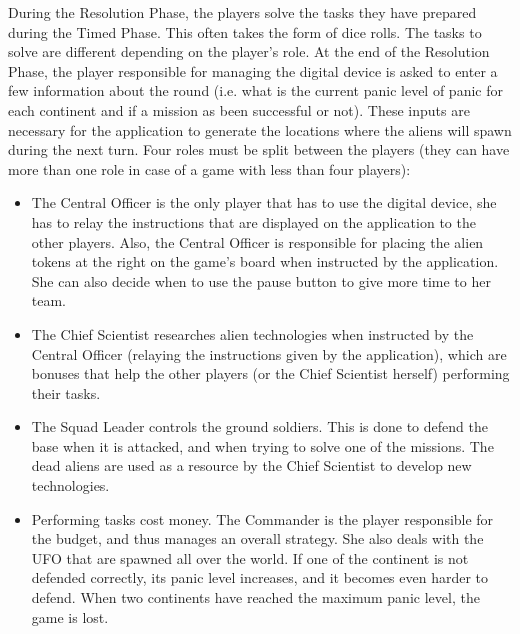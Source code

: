 During the Resolution Phase, the players solve the tasks they have prepared during the Timed Phase. This often takes the form of dice rolls. The tasks to solve are different depending on the player's role. At the end of the Resolution Phase, the player responsible for managing the digital device is asked to enter a few information about the round (i.e. what is the current panic level of panic for each continent and if a mission as been successful or not). These inputs are necessary for the application to generate the locations where the aliens will spawn during the next turn. Four roles must be split between the players (they can have more than one role in case of a game with less than four players):
\begin{itemize}
\item The Central Officer is the only player that has to use the digital device, she has to relay the instructions that are displayed on the application to the other players. Also, the Central Officer is responsible for placing the alien tokens at the right on the game's board when instructed by the application. She can also decide when to use the pause button to give more time to her team.
\item The Chief Scientist researches alien technologies when instructed by the Central Officer (relaying the instructions given by the application), which are bonuses that help the other players (or the Chief Scientist herself) performing their tasks.
\item The Squad Leader controls the ground soldiers. This is done to defend the base when it is attacked, and when trying to solve one of the missions. The dead aliens are used as a resource by the Chief Scientist to develop new technologies.
\item Performing tasks cost money. The Commander is the player responsible for the budget, and thus manages an overall strategy. She also deals with the UFO that are spawned all over the world. If one of the continent is not defended correctly, its panic level increases, and it becomes even harder to defend. When two continents have reached the maximum panic level, the game is lost.
\end{itemize}
